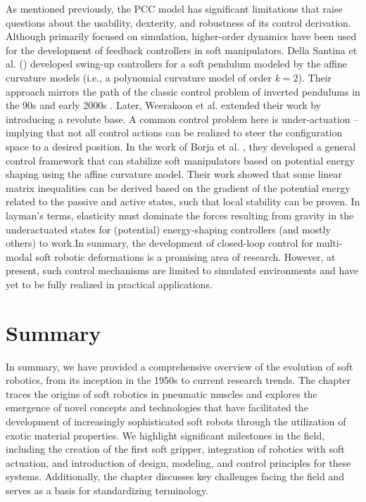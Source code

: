 As mentioned previously, the PCC model has significant limitations that raise questions about the usability, dexterity, and robustness of its control derivation. Although primarily focused on simulation, higher-order dynamics have been used for the development of feedback controllers in soft manipulators. Della Santina et al. (\cite{DellaSantina2021}) developed swing-up controllers for a soft pendulum modeled by the affine curvature models (i.e., a polynomial curvature model \cite{DellaSantina2020} of order $k = 2$). Their approach mirrors the path of the classic control problem of inverted pendulums in the 90s and early 2000s \cite{Spong1996,Spong1996a,Ortega1998,Shiriaev1999Dec}. Later, Weerakoon et al. \cite{Weerakoon2021Dec} extended their work by introducing a revolute base. A common control problem here is under-actuation \cite{Tedrake2022,Spong2006,Murray1994} -- implying that not all control actions can be realized to steer the configuration space to a desired position. In the work of Borja et al. \cite{Borja2022Apr}, they developed a general control framework that can stabilize soft manipulators based on potential energy shaping using the affine curvature model. Their work showed that some linear matrix inequalities can be derived based on the gradient of the potential energy related to the passive and active states, such that local stability can be proven. In layman's terms, elasticity must dominate the forces resulting from gravity in the underactuated states for (potential) energy-shaping controllers (and mostly others) to work.In summary, the development of closed-loop control for multi-modal soft robotic deformations is a promising area of research. However, at present, such control mechanisms are limited to simulated environments and have yet to be fully realized in practical applications.

\section{Summary}
In summary, we have provided a comprehensive overview of the evolution of soft robotics, from its inception in the 1950s to current research trends. The chapter traces the origins of soft robotics in pneumatic muscles and explores the emergence of novel concepts and technologies that have facilitated the development of increasingly sophisticated soft robots through the utilization of exotic material properties. We highlight significant milestones in the field, including the creation of the first soft gripper, integration of robotics with soft actuation, and introduction of design, modeling, and control principles for these systems. Additionally, the chapter discusses key challenges facing the field and serves as a basis for standardizing terminology.